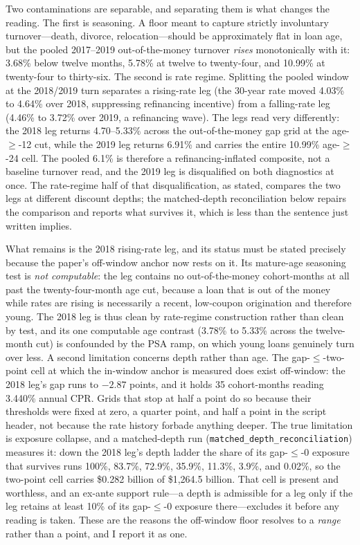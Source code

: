 \documentclass[12pt]{article}
\begin{document}
Two contaminations are separable, and separating them is what changes the reading. The first is seasoning. A floor meant to capture strictly involuntary turnover---death, divorce, relocation---should be approximately flat in loan age, but the pooled 2017--2019 out-of-the-money turnover \emph{rises} monotonically with it: 3.68\% below twelve months, 5.78\% at twelve to twenty-four, and 10.99\% at twenty-four to thirty-six. The second is rate regime. Splitting the pooled window at the 2018/2019 turn separates a rising-rate leg (the 30-year rate moved 4.03\% to 4.64\% over 2018, suppressing refinancing incentive) from a falling-rate leg (4.46\% to 3.72\% over 2019, a refinancing wave). The legs read very differently: the 2018 leg returns 4.70--5.33\% across the out-of-the-money gap grid at the age-$\geq$-12 cut, while the 2019 leg returns 6.91\% and carries the entire 10.99\% age-$\geq$-24 cell. The pooled 6.1\% is therefore a refinancing-inflated composite, not a baseline turnover read, and the 2019 leg is disqualified on both diagnostics at once. The rate-regime half of that disqualification, as stated, compares the two legs at different discount depths; the matched-depth reconciliation below repairs the comparison and reports what survives it, which is less than the sentence just written implies.

What remains is the 2018 rising-rate leg, and its status must be stated precisely because the paper's off-window anchor now rests on it. Its mature-age seasoning test is \emph{not computable}: the leg contains no out-of-the-money cohort-months at all past the twenty-four-month age cut, because a loan that is out of the money while rates are rising is necessarily a recent, low-coupon origination and therefore young. The 2018 leg is thus clean by rate-regime construction rather than clean by test, and its one computable age contrast (3.78\% to 5.33\% across the twelve-month cut) is confounded by the PSA ramp, on which young loans genuinely turn over less. A second limitation concerns depth rather than age. The gap-$\leq$-two-point cell at which the in-window anchor is measured does exist off-window: the 2018 leg's gap runs to $-2.87$ points, and it holds 35 cohort-months reading 3.440\% annual CPR. Grids that stop at half a point do so because their thresholds were fixed at zero, a quarter point, and half a point in the script header, not because the rate history forbade anything deeper. The true limitation is exposure collapse, and a matched-depth run (\texttt{matched\_depth\_reconciliation}) measures it: down the 2018 leg's depth ladder the share of its gap-$\leq$-0 exposure that survives runs 100\%, 83.7\%, 72.9\%, 35.9\%, 11.3\%, 3.9\%, and 0.02\%, so the two-point cell carries \$0.282 billion of \$1{,}264.5 billion. That cell is present and worthless, and an ex-ante support rule---a depth is admissible for a leg only if the leg retains at least 10\% of its gap-$\leq$-0 exposure there---excludes it before any reading is taken. These are the reasons the off-window floor resolves to a \emph{range} rather than a point, and I report it as one.
\end{document}
